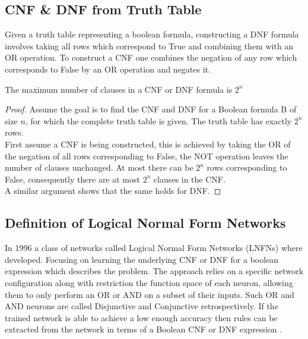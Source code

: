 \subsection{CNF \& DNF from Truth Table} \label{subsec:construct-cnfdnf}
Given a truth table representing a boolean formula, constructing a DNF formula involves taking all rows which correspond to True and combining them with an OR operation. To construct a CNF one combines the negation of any row which corresponds to False by an OR operation and negates it.

\begin{theorem}
	The maximum number of clauses in a CNF or DNF formula is $2^n$
	\label{thm:max-clause-cnfdnf}
\end{theorem}

\begin{proof}
	Assume the goal is to find the CNF and DNF for a Boolean formula B of size $n$, for which the complete truth table is given. The truth table has exactly $2^n$ rows.\\
	
	First assume a CNF is being constructed, this is achieved by taking the OR of the negation of all rows corresponding to False, the NOT operation leaves the number of clauses unchanged. At most there can be $2^n$ rows corresponding to False, consequently there are at most $2^n$ clauses in the CNF.\\
	
	A similar argument shows that the same holds for DNF.
\end{proof}

\subsection{Definition of Logical Normal Form Networks}
In 1996 a class of networks called Logical Normal Form Networks \cite{herrmann1996backpropagation} (LNFNs) where developed. Focusing on learning the underlying CNF or DNF for a boolean expression which describes the problem. The approach relies on a specific network configuration along with restriction the function space of each neuron, allowing them to only perform an OR or AND on a subset of their inputs. Such OR and AND neurons are called Disjunctive and Conjunctive retrospectively. If the trained network is able to achieve a low enough accuracy then rules can be extracted from the network in terms of a Boolean CNF or DNF expression \cite{herrmann1996backpropagation}.\\


